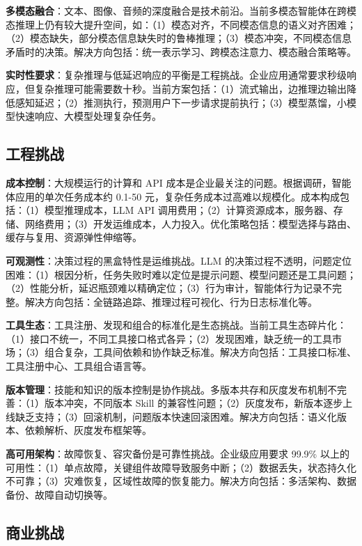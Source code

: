 \documentclass[12pt,a4paper]{article}
\begin{document}
\textbf{多模态融合}：文本、图像、音频的深度融合是技术前沿。当前多模态智能体在跨模态推理上仍有较大提升空间，如：（1）模态对齐，不同模态信息的语义对齐困难；（2）模态缺失，部分模态信息缺失时的鲁棒推理；（3）模态冲突，不同模态信息矛盾时的决策。解决方向包括：统一表示学习、跨模态注意力、模态融合策略等。

\textbf{实时性要求}：复杂推理与低延迟响应的平衡是工程挑战。企业应用通常要求秒级响应，但复杂推理可能需要数十秒。当前方案包括：（1）流式输出，边推理边输出降低感知延迟；（2）推测执行，预测用户下一步请求提前执行；（3）模型蒸馏，小模型快速响应、大模型处理复杂任务。

\subsection{工程挑战}

\textbf{成本控制}：大规模运行的计算和 API 成本是企业最关注的问题。根据调研，智能体应用的单次任务成本约 0.1-50 元，复杂任务成本过高难以规模化。成本构成包括：（1）模型推理成本，LLM API 调用费用；（2）计算资源成本，服务器、存储、网络费用；（3）开发运维成本，人力投入。优化策略包括：模型选择与路由、缓存与复用、资源弹性伸缩等。

\textbf{可观测性}：决策过程的黑盒特性是运维挑战。LLM 的决策过程不透明，问题定位困难：（1）根因分析，任务失败时难以定位是提示问题、模型问题还是工具问题；（2）性能分析，延迟瓶颈难以精确定位；（3）行为审计，智能体行为记录不完整。解决方向包括：全链路追踪、推理过程可视化、行为日志标准化等。

\textbf{工具生态}：工具注册、发现和组合的标准化是生态挑战。当前工具生态碎片化：（1）接口不统一，不同工具接口格式各异；（2）发现困难，缺乏统一的工具市场；（3）组合复杂，工具间依赖和协作缺乏标准。解决方向包括：工具接口标准、工具注册中心、工具组合语言等。

\textbf{版本管理}：技能和知识的版本控制是协作挑战。多版本共存和灰度发布机制不完善：（1）版本冲突，不同版本 Skill 的兼容性问题；（2）灰度发布，新版本逐步上线缺乏支持；（3）回滚机制，问题版本快速回滚困难。解决方向包括：语义化版本、依赖解析、灰度发布框架等。

\textbf{高可用架构}：故障恢复、容灾备份是可靠性挑战。企业级应用要求 99.9\% 以上的可用性：（1）单点故障，关键组件故障导致服务中断；（2）数据丢失，状态持久化不可靠；（3）灾难恢复，区域性故障的恢复能力。解决方向包括：多活架构、数据备份、故障自动切换等。

\subsection{商业挑战}
\end{document}

